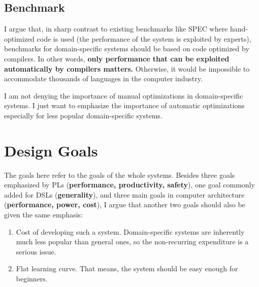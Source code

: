 \documentclass[11pt]{article}
\begin{document}

\subsection{Benchmark}
I argue that, in sharp contrast to existing benchmarks like SPEC where hand-optimized code is used (the performance of the system is exploited by experts), benchmarks for domain-specific systems should be based on code optimized by compilers.
In other words, \textbf{only performance that can be exploited automatically by compilers matters.}
Otherwise, it would be impossible to accommodate thousands of languages in the computer industry.

I am not denying the importance of manual optimizations in domain-specific systems.
I just want to emphasize the importance of automatic optimizations especially for less popular domain-specific systems.


\section{Design Goals}
The goals here refer to the goals of the whole systems. Besides three goals emphasized by PLs (\textbf{performance, productivity, safety}), one goal commonly added for DSLs (\textbf{generality}), and three main goals in computer architecture (\textbf{performance, power, cost}), I argue that another two goals should also be given the same emphasis:
\begin{enumerate}
    \item Cost of developing such a system.
    Domain-specific systems are inherently much less popular than general ones, so the non-recurring expenditure is a serious issue.
    \item Flat learning curve.
    That means, the system should be easy enough for beginners.
\end{enumerate}
\end{document}
